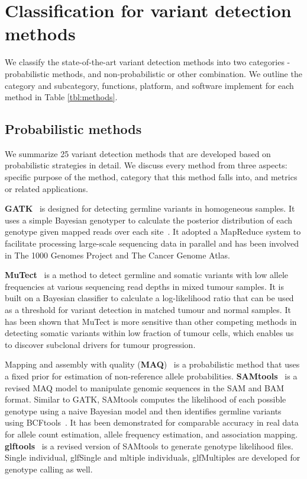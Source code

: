 \documentclass[a4,center,fleqn]{NAR}
\begin{document}
\section{Classification for variant detection methods}

We classify the state-of-the-art variant detection methods into two categories - probabilistic methods, and non-probabilistic or other combination.
We outline the category and subcategory, functions, platform, and software implement for each method in Table \ref{tbl:methods}.



\subsection{Probabilistic methods}

We summarize 25 variant detection methods that are developed based on probabilistic strategies in detail.
We discuss every method from three aspects: specific purpose of the method, category that this method falls into, and metrics or related applications.

\textbf{GATK}~\citep{McKenna2010} is designed for detecting germline variants in homogeneous samples.
It uses a simple Bayesian genotyper to calculate the posterior distribution of each genotype given mapped reads over each site~\citep{depristo2011framework}.
It adopted a MapReduce system to facilitate processing large-scale sequencing data in parallel and has been involved in The 1000 Genomes Project and The Cancer Genome Atlas.

\textbf{MuTect}~\citep{Cibulskis2013} is a method to detect germline and somatic variants with low allele frequencies at various sequencing read depths in mixed tumour samples.
It is built on a Bayesian classifier to calculate a log-likelihood ratio that can be used as a threshold for variant detection in matched tumour and normal samples.
It has been shown that MuTect is more sensitive than other competing methods in detecting somatic variants within low fraction of tumour cells, which enables us to discover subclonal drivers for tumour progression.

Mapping and assembly with quality (\textbf{MAQ})~\citep{Li2008} is a probabilistic method that uses a fixed prior for estimation of non-reference allele probabilities.
\textbf{SAMtools}~\citep{Li2009a} is a revised MAQ model to manipulate genomic sequences in the SAM and BAM format.
Similar to GATK, SAMtools computes the likelihood of each possible genotype using a naive Bayesian model and then identifies germline variants using BCFtools~\citep{li2011statistical}.
It has been demonstrated for comparable accuracy in real data for allele count estimation, allele frequency estimation, and association mapping.
\textbf{glftools}~\citep{abecasis2010} is a revised version of SAMtools to generate genotype likelihood files.
Single individual, glfSingle and mltiple individuals, glfMultiples are developed for genotype calling as well.
\end{document}
